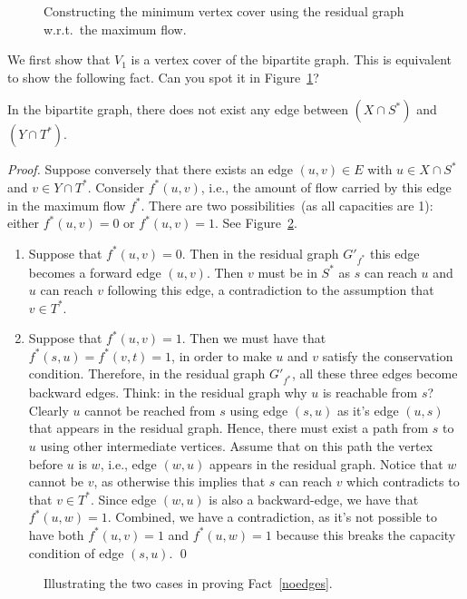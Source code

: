 \begin{figure}[!h]
\centering{}
\caption{Constructing the minimum vertex cover using the residual graph w.r.t.\ the maximum flow.}
\label{fig:residual}
\end{figure}



We first show that $V_1$ is a vertex cover of the bipartite graph. This is equivalent to show
the following fact.  Can you spot it in Figure~\ref{fig:residual}?
\begin{fact} \label{noedges}
In the bipartite graph, there does not exist any edge between $(X\cap S^*)$ and $(Y\cap T^*)$. 
\end{fact}
\emph{Proof.} Suppose conversely that there exists an edge $(u,v)\in E$ with $u\in X\cap S^*$ and $v\in Y\cap T^*$.
Consider $f^*(u,v)$, i.e., the amount of flow carried by this edge in the maximum flow $f^*$.
There are two possibilities~(as all capacities are 1): either $f^*(u,v) = 0$ or $f^*(u,v) = 1$. See Figure~\ref{fig:matching-proof}.


\begin{enumerate}
\item Suppose that $f^*(u,v) = 0$. Then in the residual graph $G'_{f^*}$ this edge becomes a forward edge $(u,v)$.
Then $v$ must be in $S^*$ as $s$ can reach $u$ and $u$ can reach $v$ following this edge, a contradiction
to the assumption that $v\in T^*$.
\item Suppose that $f^*(u,v) = 1$. Then we must have that $f^*(s,u) = f^*(v,t) = 1$, in order to make $u$ and $v$ satisfy
the conservation condition. Therefore, in the residual graph $G'_{f^*}$, all these three edges become backward edges.
Think: in the residual graph why $u$ is reachable from $s$?
Clearly $u$ cannot be reached from $s$ using edge $(s,u)$ as it's edge $(u,s)$ that appears in the residual graph.
Hence, there must exist a path from $s$ to $u$ using other intermediate vertices.
Assume that on this path the vertex before $u$ is $w$, i.e., edge $(w,u)$ appears in the residual graph.
Notice that $w$ cannot be $v$, as otherwise this implies that $s$ can reach $v$ which contradicts to that $v\in T^*$.
Since edge $(w,u)$ is also a backward-edge, we have that $f^*(u,w) = 1$.
Combined, we have a contradiction, as it's not possible to have both $f^*(u,v) = 1$ and $f^*(u,w) = 1$
because this breaks the capacity condition of edge $(s,u)$. \qed
\end{enumerate}

\begin{figure}[!h]
\centering{}
\caption{Illustrating the two cases in proving Fact~\ref{noedges}.}
\label{fig:matching-proof}
\end{figure}


